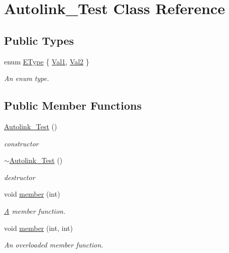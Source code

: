 \hypertarget{class_autolink___test}{}\section{Autolink\+\_\+\+Test Class Reference}
\label{class_autolink___test}
\subsection*{Public Types}
\begin{DoxyCompactItemize}
\item 
enum \mbox{\hyperlink{class_autolink___test_aeb611627c332d067bded1806b1bb45c2}{E\+Type}} \{ \mbox{\hyperlink{class_autolink___test_aeb611627c332d067bded1806b1bb45c2af70631e295bce280e74762d18af47a94}{Val1}}, 
\mbox{\hyperlink{class_autolink___test_aeb611627c332d067bded1806b1bb45c2a7d760f44a8971559d108a609b8fb9b3b}{Val2}}
 \}
\begin{DoxyCompactList}\small\item\em An enum type. \end{DoxyCompactList}\end{DoxyCompactItemize}
\subsection*{Public Member Functions}
\begin{DoxyCompactItemize}
\item 
\mbox{\hyperlink{class_autolink___test_a278d631f9943428c05b17d78f14488e2}{Autolink\+\_\+\+Test}} ()
\begin{DoxyCompactList}\small\item\em constructor \end{DoxyCompactList}\item 
\mbox{\hyperlink{class_autolink___test_a03bf46c8e2b733680035f524fd7b193b}{$\sim$\+Autolink\+\_\+\+Test}} ()
\begin{DoxyCompactList}\small\item\em destructor \end{DoxyCompactList}\item 
void \mbox{\hyperlink{class_autolink___test_a393ea281f235a2f603d98daf72b0d411}{member}} (int)
\begin{DoxyCompactList}\small\item\em \mbox{\hyperlink{class_a}{A}} member function. \end{DoxyCompactList}\item 
void \mbox{\hyperlink{class_autolink___test_acf783a43c2b4b6cc9dd2361784eca2e1}{member}} (int, int)
\begin{DoxyCompactList}\small\item\em An overloaded member function. \end{DoxyCompactList}\end{DoxyCompactItemize}
